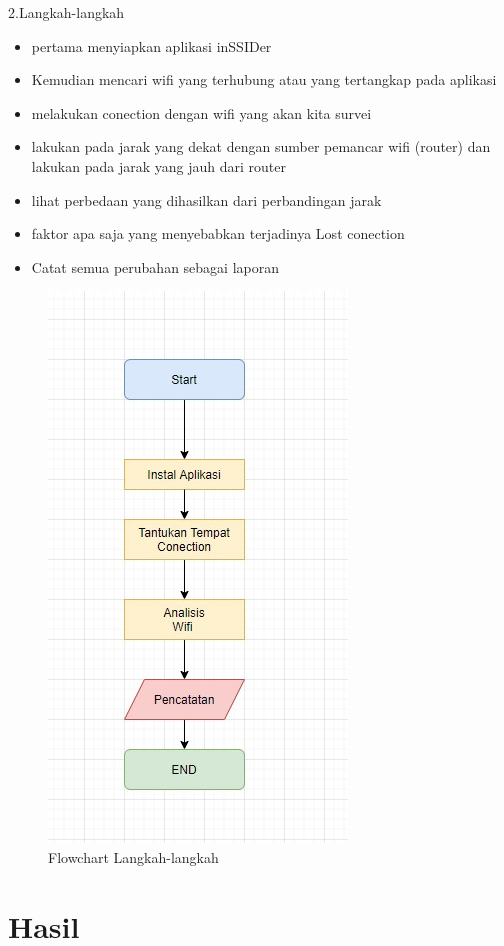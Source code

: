 \documentclass[conference]{IEEEtran}
\begin{document}
2.Langkah-langkah 
\begin{itemize}
    \item pertama menyiapkan aplikasi inSSIDer
    \item Kemudian mencari wifi yang terhubung atau yang tertangkap pada aplikasi
    \item melakukan conection dengan wifi yang akan kita survei
    \item lakukan pada jarak yang dekat dengan sumber pemancar wifi (router) dan lakukan pada jarak yang jauh dari router
    \item lihat perbedaan yang dihasilkan dari perbandingan jarak
    \item faktor apa saja yang menyebabkan terjadinya Lost conection
    \item Catat semua perubahan sebagai laporan
\end{itemize}
\vspace{4cm}

\begin{figure}[h]
\centering
    \includegraphics[width=.4\textwidth]{image/001.jpg}
     \caption{Flowchart Langkah-langkah}
\end{figure}

\section{Hasil}
\end{document}
